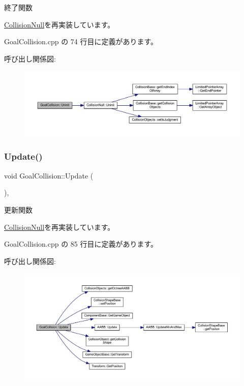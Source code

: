 終了関数 



\mbox{\hyperlink{class_collision_null_a7c6d0ec502efc55e2f406415451152f5}{Collision\+Null}}を再実装しています。



 Goal\+Collision.\+cpp の 74 行目に定義があります。

呼び出し関係図\+:\nopagebreak
\begin{figure}[H]
\begin{center}
\leavevmode
\includegraphics[width=350pt]{class_goal_collision_ab818bad44ffcd595f1c495e659c0b348_cgraph}
\end{center}
\end{figure}
\mbox{\label{class_goal_collision_a1e3995dc2f5ba2678580d06699ca6936}} 
\subsubsection{\texorpdfstring{Update()}{Update()}}
{\footnotesize\ttfamily void Goal\+Collision\+::\+Update (\begin{DoxyParamCaption}{ }\end{DoxyParamCaption})\hspace{0.3cm}{\ttfamily [override]}, {\ttfamily [virtual]}}



更新関数 



\mbox{\hyperlink{class_collision_null_a5e5e094e3fbe3ccc0515e485c739bd15}{Collision\+Null}}を再実装しています。



 Goal\+Collision.\+cpp の 85 行目に定義があります。

呼び出し関係図\+:\nopagebreak
\begin{figure}[H]
\begin{center}
\leavevmode
\includegraphics[width=350pt]{class_goal_collision_a1e3995dc2f5ba2678580d06699ca6936_cgraph}
\end{center}
\end{figure}



